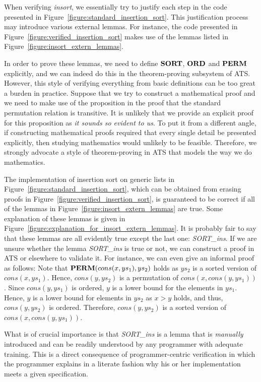 \documentclass{llncs}
\begin{document}
When verifying {\it insort}, we essentially try to justify each step in the
code presented in Figure~\ref{figure:standard_insertion_sort}. This
justification process may introduce various external lemmas. For instance,
the code presented in Figure~\ref{figure:verified_insertion_sort} makes use
of the lemmas listed in Figure~\ref{figure:insort_extern_lemmas}.

In order to prove these lemmas, we need to define ${\bf SORT}$, ${\bf ORD}$ and
${\bf PERM}$ explicitly, and we can indeed do this in the theorem-proving
subsystem of ATS. However, this style of verifying everything from basic
definitions can be too great a burden in practice. Suppose that we try to
construct a mathematical proof and we need to make use of the proposition
in the proof that the standard permutation relation is transitive. It is
unlikely that we provide an explicit proof for this proposition as {\em it
  sounds so evident to us}. To put it from a different angle, if
constructing mathematical proofs required that every single detail be
presented explicitly, then studying mathematics would unlikely to be
feasible. Therefore, we strongly advocate a style of theorem-proving in ATS
that models the way we do mathematics.

The implementation of insertion sort on generic lists in
Figure~\ref{figure:standard_insertion_sort}, which can be obtained from
erasing proofs in Figure~\ref{figure:verified_insertion_sort}, is
guaranteed to be correct if all of the lemmas in
Figure~\ref{figure:insort_extern_lemmas} are true. Some explanation of these
lemmas is given in Figure~\ref{figure:explanation_for_insort_extern_lemmas}.  It
is probably fair to say that these lemmas are all evidently true except
the last one: {\it SORT\_ins}.  If we are unsure whether the lemma {\it
  SORT\_ins} is true or not, we can construct a proof in ATS or elsewhere
to validate it. For instance, we can even give an informal proof as
follows: {
Note that ${\bf PERM}(cons (x, ys_1), ys_2)$ holds as $ys_2$ is a sorted
version of $cons(x, ys_1)$. Hence, $cons (y, ys_2)$ is a permutation of
$cons (x, cons (y, ys_1))$. Since $cons (y, ys_1)$ is ordered, $y$ is a
lower bound for the elements in $ys_1$. Hence, $y$ is a lower bound for
elements in $ys_2$ as $x>y$ holds, and thus, $cons (y, ys_2)$ is ordered.
Therefore, $cons (y, ys_2)$ is a sorted version of 
$cons (x, cons (y, ys_1))$.
} %

What is of crucial importance is that {\it SORT\_ins} is a lemma that is
{\em manually} introduced and can be readily understood by any programmer
with adequate training. This is a direct consequence of programmer-centric
verification in which the programmer explains in a literate fashion why his
or her implementation meets a given specification.
\end{document}
